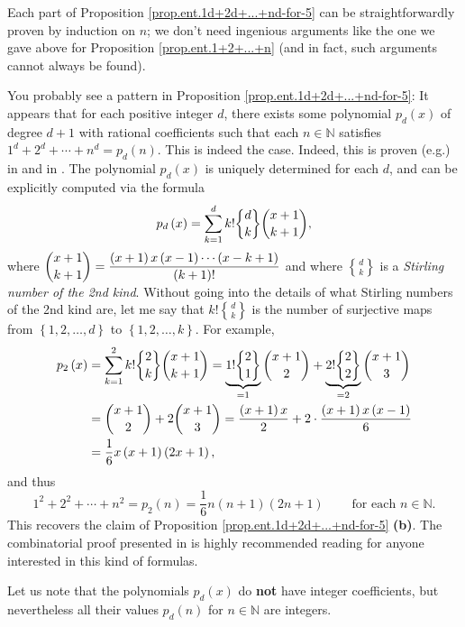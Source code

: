 \documentclass[numbers=enddot,12pt,final,onecolumn,notitlepage]{scrartcl}%
\numberwithin{exer}{subsection}
\theoremstyle{definition}
\newenvironment{fineprint}{\begin{small}}{\end{small}}
\let\sumnonlimits\sum
\renewcommand{\sum}{\sumnonlimits\limits}
\begin{document}
Each part of Proposition \ref{prop.ent.1d+2d+...+nd-for-5} can be
straightforwardly proven by induction on $n$; we don't need ingenious
arguments like the one we gave above for Proposition \ref{prop.ent.1+2+...+n}
(and in fact, such arguments cannot always be found).

\begin{fineprint}
You probably see a pattern in Proposition \ref{prop.ent.1d+2d+...+nd-for-5}:
It appears that for each positive integer $d$, there exists some polynomial
$p_{d}\left(  x\right)  $ of degree $d+1$ with rational coefficients such that
each $n\in\mathbb{N}$ satisfies $1^{d}+2^{d}+\cdots+n^{d}=p_{d}\left(
n\right)  $. This is indeed the case. Indeed, this is proven (e.g.) in
\cite[Proposition 23.2]{Galvin} and in \cite[Theorem 3.7]{lucas}. The
polynomial $p_{d}\left(  x\right)  $ is uniquely determined for each $d$, and
can be explicitly computed via the formula%
\[
p_{d}\left(  x\right)  =\sum_{k=1}^{d}k!%
\genfrac{\{}{\}}{0pt}{0}{d}{k}%
\dbinom{x+1}{k+1},
\]
where $\dbinom{x+1}{k+1}=\dfrac{\left(  x+1\right)  x\left(  x-1\right)
\cdots\left(  x-k+1\right)  }{\left(  k+1\right)  !}$ and where $%
\genfrac{\{}{\}}{0pt}{0}{d}{k}%
$ is a \textit{Stirling number of the 2nd kind}. Without going into the
details of what Stirling numbers of the 2nd kind are, let me say that $k!%
\genfrac{\{}{\}}{0pt}{0}{d}{k}%
$ is the number of surjective maps from $\left\{  1,2,\ldots,d\right\}  $ to
$\left\{  1,2,\ldots,k\right\}  $. For example,%
\begin{align*}
p_{2}\left(  x\right)   &  =\sum_{k=1}^{2}k!%
\genfrac{\{}{\}}{0pt}{0}{2}{k}%
\dbinom{x+1}{k+1}=\underbrace{1!%
\genfrac{\{}{\}}{0pt}{0}{2}{1}%
}_{=1}\dbinom{x+1}{2}+\underbrace{2!%
\genfrac{\{}{\}}{0pt}{0}{2}{2}%
}_{=2}\dbinom{x+1}{3}\\
&  =\dbinom{x+1}{2}+2\dbinom{x+1}{3}=\dfrac{\left(  x+1\right)  x}{2}%
+2\cdot\dfrac{\left(  x+1\right)  x\left(  x-1\right)  }{6}\\
&  =\dfrac{1}{6}x\left(  x+1\right)  \left(  2x+1\right)  ,
\end{align*}
and thus%
\[
1^{2}+2^{2}+\cdots+n^{2}=p_{2}\left(  n\right)  =\dfrac{1}{6}n\left(
n+1\right)  \left(  2n+1\right)  \ \ \ \ \ \ \ \ \ \ \text{for each }%
n\in\mathbb{N}.
\]
This recovers the claim of Proposition \ref{prop.ent.1d+2d+...+nd-for-5}
\textbf{(b)}. The combinatorial proof presented in \cite[Proposition
23.2]{Galvin} is highly recommended reading for anyone interested in this kind
of formulas.

Let us note that the polynomials $p_{d}\left(  x\right)  $ do \textbf{not}
have integer coefficients, but nevertheless all their values $p_{d}\left(
n\right)  $ for $n\in\mathbb{N}$ are integers.
\end{fineprint}
\end{document}
